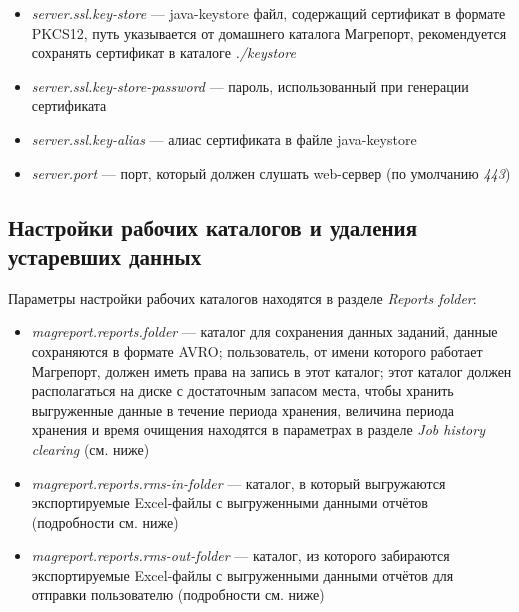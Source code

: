 \documentclass[../user-manual.tex]{subfiles}
\begin{document}
	\begin{itemize}
		\item \textit{server.ssl.key-store} --- java-keystore файл, содержащий сертификат в формате PKCS12, путь указывается от домашнего каталога Магрепорт, рекомендуется сохранять сертификат в каталоге \textit{./keystore}
		
		\item \textit{server.ssl.key-store-password} --- пароль, использованный при генерации сертификата
		
		\item \textit{server.ssl.key-alias} --- алиас сертификата в файле java-keystore
		
		\item \textit{server.port} --- порт, который должен слушать web-сервер (по умолчанию \textit{443})
	\end{itemize}
	
	\subsection{Настройки рабочих каталогов и удаления устаревших данных}
	
	Параметры настройки рабочих каталогов находятся в разделе \textit{Reports folder}:
	
	\begin{itemize}
		\item \textit{magreport.reports.folder} --- каталог для сохранения данных заданий, данные сохраняются в формате AVRO; пользователь, от имени которого работает Магрепорт, должен иметь права на запись в этот каталог; этот каталог должен располагаться на диске с достаточным запасом места, чтобы хранить выгруженные данные в течение периода хранения, величина периода хранения и время очищения находятся в параметрах в разделе \textit{Job history clearing} (см. ниже)
		
		\item \textit{magreport.reports.rms-in-folder} --- каталог, в который выгружаются экспортируемые Excel-файлы с выгруженными данными отчётов (подробности см. ниже)
		
		\item \textit{magreport.reports.rms-out-folder} --- каталог, из которого забираются экспортируемые Excel-файлы с выгруженными данными отчётов для отправки пользователю (подробности см. ниже)
		
	\end{itemize}
\end{document}
